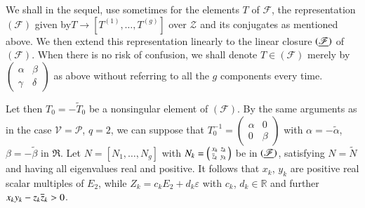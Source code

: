 We shall in the sequel, use sometimes for the elements $T$ of
$\mathscr{F}$, the representation $(\mathscr{F})$ given
by\pageoriginale $T\to[T^{(1)},\ldots,T^{(g)}]$ over $\mathscr{Z}$ and
its conjugates as mentioned above. We then extend this representation
linearly to the linear closure $(\underline{\mathscr{F}})$ of
$(\mathscr{F})$. When there is no risk of confusion, we shall denote
$T\in(\mathscr{F})$ merely by $\left(\begin{smallmatrix} \alpha &
  \beta\\ \gamma & \delta\end{smallmatrix}\right)$ as above without
  referring to all the $g$ components every time.

Let then $T_{0}=-\widetilde{T}_{0}$ be a nonsingular element of
$(\mathscr{F})$. By the same arguments as in the case
$\mathscr{V}=\mathscr{P}$, $q=2$, we can suppose that
$T^{-1}_{0}=\left(\begin{smallmatrix} \alpha & 0\\ 0 & \beta
\end{smallmatrix}\right)$ with $\alpha=-\widetilde{\alpha}$,
$\beta=-\widetilde{\beta}$ in $\mathfrak{R}$. Let
$N=[N_{1},\ldots,N_{g}]$ with $N_{k}=\left(\begin{smallmatrix}x_{k} &
  z_{k}\\ \overline{z}_{k} & y_{k}\end{smallmatrix}\right)$ be in
$(\underline{\mathscr{F}})$, satisfying $N=\widetilde{N}$ and having all
eigenvalues real and positive. It follows that $x_{k}$, $y_{k}$ are
positive real scalar multiples of $E_{2}$, while
$Z_{k}=c_{k}E_{2}+d_{k}\varepsilon$ with $c_{k}$, $d_{k}\in\mathbb{R}$
and further $x_{k}y_{k}-z_{k}\overline{z}_{k}>0$. 

